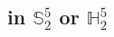 \documentclass[dvipdfmx, xcolor=svgnames]{beamer}
\theoremstyle{plain}
\theoremstyle{definition}
\theoremstyle{remark}
\renewcommand{\arraystretch}{1.1}
\def\rnum#1{\expandafter{\romannumeral #1}}
\begin{document}


\subsection{in \(\mathbb{S}^5_2\) or \(\mathbb{H}^5_2\)}
\end{document}
